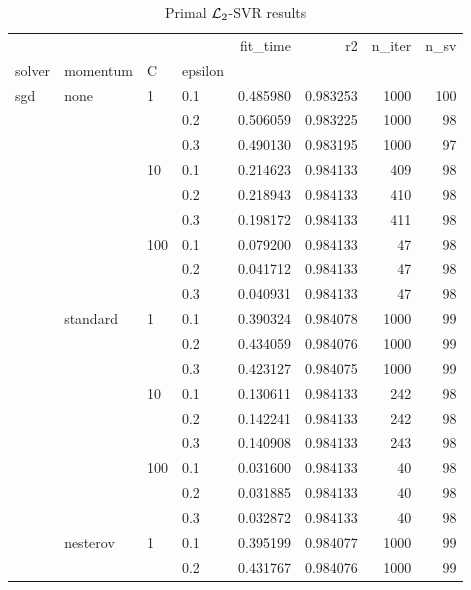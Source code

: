 \begin{table}[H]
\centering
\caption{Primal $\protect \mathcal{L}_2$-SVR results}
\label{primal_l2_svr_cv_results}
\begin{tabular}{llllrrrr}
\toprule
          &   &     &     &  fit\_time &        r2 &  n\_iter &  n\_sv \\
solver & momentum & C & epsilon &           &           &         &       \\
\midrule
sgd & none & 1   & 0.1 &  0.485980 &  0.983253 &    1000 &   100 \\
          &   &     & 0.2 &  0.506059 &  0.983225 &    1000 &    98 \\
          &   &     & 0.3 &  0.490130 &  0.983195 &    1000 &    97 \\
          &   & 10  & 0.1 &  0.214623 &  0.984133 &     409 &    98 \\
          &   &     & 0.2 &  0.218943 &  0.984133 &     410 &    98 \\
          &   &     & 0.3 &  0.198172 &  0.984133 &     411 &    98 \\
          &   & 100 & 0.1 &  0.079200 &  0.984133 &      47 &    98 \\
          &   &     & 0.2 &  0.041712 &  0.984133 &      47 &    98 \\
          &   &     & 0.3 &  0.040931 &  0.984133 &      47 &    98 \\
          & standard & 1   & 0.1 &  0.390324 &  0.984078 &    1000 &    99 \\
          &   &     & 0.2 &  0.434059 &  0.984076 &    1000 &    99 \\
          &   &     & 0.3 &  0.423127 &  0.984075 &    1000 &    99 \\
          &   & 10  & 0.1 &  0.130611 &  0.984133 &     242 &    98 \\
          &   &     & 0.2 &  0.142241 &  0.984133 &     242 &    98 \\
          &   &     & 0.3 &  0.140908 &  0.984133 &     243 &    98 \\
          &   & 100 & 0.1 &  0.031600 &  0.984133 &      40 &    98 \\
          &   &     & 0.2 &  0.031885 &  0.984133 &      40 &    98 \\
          &   &     & 0.3 &  0.032872 &  0.984133 &      40 &    98 \\
          & nesterov & 1   & 0.1 &  0.395199 &  0.984077 &    1000 &    99 \\
          &   &     & 0.2 &  0.431767 &  0.984076 &    1000 &    99 \\

\end{tabular}
\end{table}
